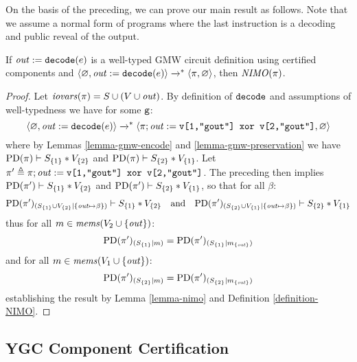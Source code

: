 On the basis of the preceding, we can prove our main result as
follows. Note that we assume a normal form of programs where the last
instruction is a decoding and public reveal of the output.
\begin{theorem}
  \label{theorem-gmw-NIMO}
  If $\mathit{out} := \texttt{decode}(e)$ is a well-typed GMW circuit
  definition using certified components and
  $\langle \varnothing,\mathit{out} := \texttt{decode}(e) \rangle \xrightarrow{}^{*}
  \langle \pi,\varnothing \rangle$, then $\mathit{NIMO}(\pi)$.
\end{theorem}
\begin{proof}
  Let $\mathit{iovars}(\pi) = S \cup (V \cup \mathit{out})$. By definition of $\texttt{decode}$
  and assumptions of well-typedness we have for some $\texttt{g}$:
  $$
  \langle \varnothing,\mathit{out} := \texttt{decode}(e) \rangle \xrightarrow{}^{*}
  \langle \pi;\mathit{out} := \texttt{v[1,"gout"] xor v[2,"gout"]},\varnothing \rangle
  $$
  where by Lemmas \ref{lemma-gmw-encode} and \ref{lemma-gmw-preservation} we
  have $\mathrm{PD}(\pi) \vdash S_{\{1\}} * V_{\{2\}}$ and
  $\mathrm{PD}(\pi) \vdash S_{\{2\}} * V_{\{1\}}$.
  Let $\pi' \triangleq \pi;\mathit{out} := \texttt{v[1,"gout"] xor v[2,"gout"]}$. The
  preceding then implies
  $\mathrm{PD}(\pi') \vdash S_{\{1\}} * V_{\{2\}}$ and
  $\mathrm{PD}(\pi') \vdash S_{\{2\}} * V_{\{1\}}$,
  so that for all $\beta$:
  $$\mathrm{PD}(\pi')_{({S_{\{1\}} \cup V_{\{2\}}}|{\{ \mathit{out} \mapsto \beta \}})} \vdash S_{\{1\}} * V_{\{2\}}
  \quad \text{and} \quad
    \mathrm{PD}(\pi')_{({S_{\{2\}} \cup V_{\{1\}}}|{\{ \mathit{out} \mapsto \beta \}})} \vdash S_{\{2\}} * V_{\{1\}}$$
  thus for all $m \in \mathit{mems}(V_2 \cup \{ \mathit{out} \})$:
  $$\mathrm{PD}(\pi')_{({S_{\{1\}}}|{m})}
  = \mathrm{PD}(\pi')_{({S_{\{1\}}}|{m_{\{\mathit{out}\}}})}$$
  and for all $m \in \mathit{mems}(V_1 \cup \{ \mathit{out} \})$:
  $$\mathrm{PD}(\pi')_{({S_{\{2\}}}|{m})}
  = \mathrm{PD}(\pi')_{({S_{\{2\}}}|{m_{\{\mathit{out}\}}})}$$
  establishing the result by Lemma \ref{lemma-nimo} and Definition \ref{definition-NIMO}. 
\end{proof}

\subsection{YGC Component Certification}
\label{section-ygc-certification}

